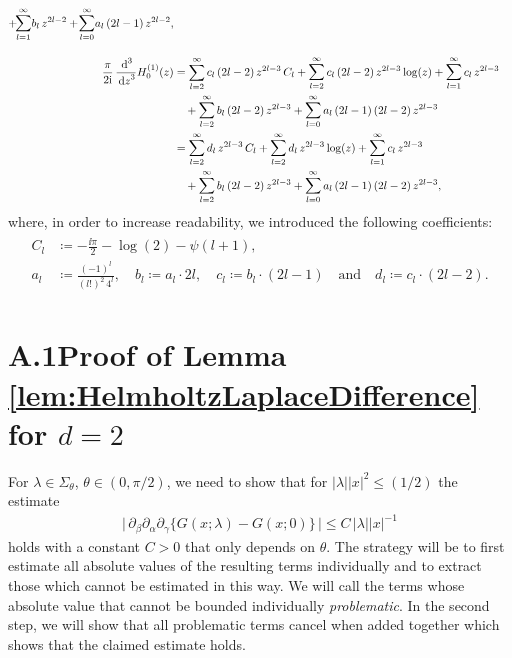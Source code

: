 \begin{align*}
  +  \!\mathlarger{\sum}_{l = 1}^\infty b_l \, z^{2l - 2} 
  +  \!\mathlarger{\sum}_{l = 0}^\infty a_l \, (2l - 1) \, z^{2l - 2}, \\[1.0em]
  \frac{\pi}{2\ii} \, \frac{\d{}^3}{\d z^3} H_0^{(1)}(z)
  &= \sum_{l = 2}^\infty c_l \, (2l - 2) \, z^{2l - 3} \, C_l 
  +  \mathlarger{\sum}_{l = 2}^\infty \, c_l \, (2l - 2) \, z^{2l - 3} \log(z) 
  +  \mathlarger{\sum}_{l = 1}^\infty \, c_l \, z^{2l - 3} \\
 &\quad  
  + \mathlarger{\sum}_{l = 2}^\infty \, b_l \, (2l - 2) \, z^{2l - 3} 
  + \mathlarger{\sum}_{l = 0}^\infty \, a_l \, (2l - 1) \, (2l - 2) \, z^{2l - 3} \\
  &= \mathlarger{\sum}_{l = 2}^\infty \, d_l \, z^{2l - 3} \, C_l 
  + \mathlarger{\sum}_{l = 2}^\infty \, d_l \, z^{2l - 3} \log(z) 
  + \mathlarger{\sum}_{l = 1}^\infty \, c_l \, z^{2l - 3} \\
 &\quad  + \mathlarger{\sum}_{l = 2}^\infty \, b_l \, (2l - 2) \, z^{2l - 3} 
  + \mathlarger{\sum}_{l = 0}^\infty \, a_l \, (2l - 1)\, (2l - 2) \, z^{2l - 3} ,
\end{align*}
where, in order to increase readability, we introduced the following coefficients:
\begin{align}
  \begin{alignedat}{1}
  C_l &\coloneqq -\frac{\ii \pi}{2} - \log(2) - \psi(l + 1), \\
  a_l &\coloneqq \frac{(-1)^l}{(l!)^2 \, 4^l}, \quad
  b_l \coloneqq a_l \cdot  2l, \quad
  c_l \coloneqq b_l \cdot (2l - 1) \quad\text{and}\quad
  d_l \coloneqq c_l \cdot (2l - 2).
  \end{alignedat}\label{defnConst}\tag{D1}
\end{align}

\section*{A.1\quad Proof of Lemma \ref{lem:HelmholtzLaplaceDifference} for $d = 2$}
\label{sec:A1}

For $\lambda \in \Sigma_\theta$, $\theta \in (0, \pi/2)$, we need to show that for $|\lambda| |x|^2 \leq (1/2)$ the estimate
\begin{align*}
  \Big|\, \partial_\beta \partial_\alpha \partial_\gamma \big\{ G(x; \lambda) - G(x; 0) \big\} \, \Big|
  \leq C\, |\lambda| |x|^{-1}
\end{align*}
holds with a constant $C > 0$ that only depends on $\theta$.
The strategy will be to first estimate all absolute values of the resulting terms individually and to extract those which cannot be estimated in this way.
We will call the terms whose absolute value that cannot be bounded individually \emph{problematic}.
In the second step, we will show that all problematic terms cancel when added together which shows that the claimed estimate holds.

